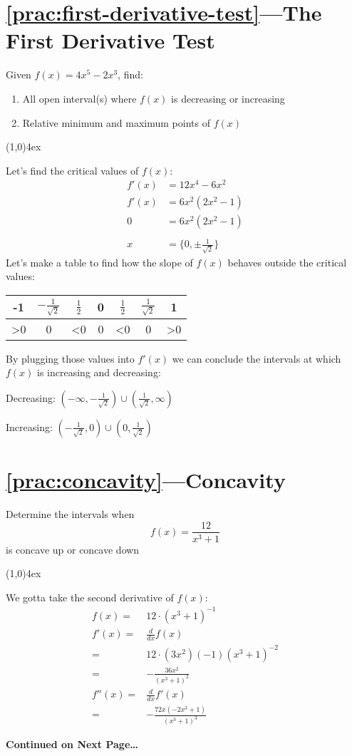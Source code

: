 \documentclass{MathNotes}
\newcommand{\continued}{
	\mbox{}
	\vfill
	\textbf{Continued on Next Page\ldots}\newpage
}
\newcommand{\br}{
	\begin{center}
		\line(1,0){4ex}
	\end{center}}
\begin{document}
\section*{\ref{prac:first-derivative-test}---The First Derivative Test}\label{ans:first-derivative-test}
Given $\displaystyle f(x)=4x^5-2x^3$, find:
\begin{enumerate}
	\item All open interval(s) where $f(x)$ is decreasing or increasing
	\item Relative minimum and maximum points of $f(x)$
\end{enumerate}
\br
Let's find the critical values of $f(x)$:
\begin{align*}
	f'(x) & =12x^4-6x^2                  \\
	f'(x) & =6x^2(2x^2-1)                \\
	0     & =6x^2(2x^2-1)                \\
	\\
	x     & =\{0,\pm\frac{1}{\sqrt{2}}\}
\end{align*}
Let's make a table to find how the slope of $f(x)$ behaves outside the critical
values:
\begin{center}
	\begin{tabular}{c|c|c|c|c|c|c}
		-1          & $-\frac{1}{\sqrt{2}}$ & $\frac{1}{2}$ & 0 & $\frac{1}{2}$ & $\frac{1}
		{\sqrt{2}}$ & 1                                                                     \\
		\hline
		>0          & 0                     & <0            & 0 & <0            & 0
		            & >0
	\end{tabular}
\end{center}
By plugging those values into $f'(x)$ we can conclude the intervals at which
$f(x)$ is increasing and decreasing:
\begin{multicols}{2}
	\centering
	Decreasing: $(-\infty,-\frac{1}{\sqrt{2}})\cup(\frac{1}{\sqrt{2}},\infty)$

	Increasing: $(-\frac{1}{\sqrt{2}},0)\cup(0,\frac{1}{\sqrt{2}})$
\end{multicols}

\section*{\ref{prac:concavity}---Concavity}\label{ans:concavity}
Determine the intervals when \[f(x)=\frac{12}{x^3+1}\] is concave up
or concave down
\br
We gotta take the second derivative of $f(x)$:
\begin{align*}
	f(x) =  & 12\cdot(x^3+1)^{-1}                        \\
	f'(x)=  & \frac{d}{dx}f(x)                           \\
	=       & 12\cdot(3x^2)(-1)(x^3+1)^{-2}              \\
	=       & -\frac{36x^2}{\left(x^3+1\right)^2}        \\
	f''(x)= & \frac{d}{dx}f'(x)                          \\
	=       & -\frac{72x(-2x^3+1)}{\left(x^3+1\right)^3}
\end{align*}
\continued{}
\end{document}
